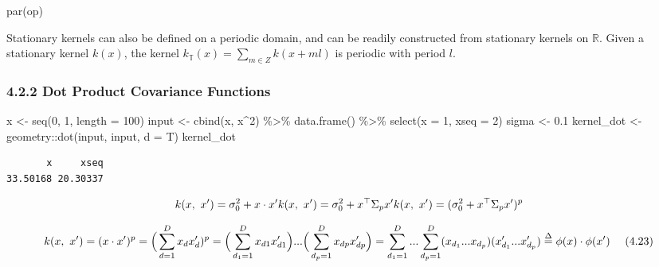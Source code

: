\documentclass[
]{article}
\newenvironment{Shaded}{\begin{snugshade}}{\end{snugshade}}
\newcommand{\AttributeTok}[1]{\textcolor[rgb]{0.77,0.63,0.00}{#1}}
\newcommand{\DecValTok}[1]{\textcolor[rgb]{0.00,0.00,0.81}{#1}}
\newcommand{\FloatTok}[1]{\textcolor[rgb]{0.00,0.00,0.81}{#1}}
\newcommand{\FunctionTok}[1]{\textcolor[rgb]{0.00,0.00,0.00}{#1}}
\newcommand{\NormalTok}[1]{#1}
\newcommand{\OtherTok}[1]{\textcolor[rgb]{0.56,0.35,0.01}{#1}}
\newcommand{\SpecialCharTok}[1]{\textcolor[rgb]{0.00,0.00,0.00}{#1}}
\begin{document}
\begin{Shaded}
\begin{Highlighting}[]
\FunctionTok{par}\NormalTok{(op)}
\end{Highlighting}
\end{Shaded}

Stationary kernels can also be defined on a periodic domain, and can be
readily constructed from stationary kernels on \(\mathbb R\). Given a
stationary kernel \(k(x)\), the kernel
\(k_{\mathbb T}(x) = \sum_{m\in Z} k(x + ml)\) is periodic with period
\(l\).

\hypertarget{dot-product-covariance-functions}{%
\subsubsection{4.2.2 Dot Product Covariance
Functions}\label{dot-product-covariance-functions}}

\begin{Shaded}
\begin{Highlighting}[]
\NormalTok{x }\OtherTok{\textless{}{-}} \FunctionTok{seq}\NormalTok{(}\DecValTok{0}\NormalTok{, }\DecValTok{1}\NormalTok{, }\AttributeTok{length =} \DecValTok{100}\NormalTok{)}
\NormalTok{input }\OtherTok{\textless{}{-}} \FunctionTok{cbind}\NormalTok{(x, x}\SpecialCharTok{\^{}}\DecValTok{2}\NormalTok{) }\SpecialCharTok{\%\textgreater{}\%}
  \FunctionTok{data.frame}\NormalTok{() }\SpecialCharTok{\%\textgreater{}\%}
  \FunctionTok{select}\NormalTok{(}\AttributeTok{x =} \DecValTok{1}\NormalTok{, }\AttributeTok{xseq =} \DecValTok{2}\NormalTok{)}
\NormalTok{sigma }\OtherTok{\textless{}{-}} \FloatTok{0.1}
\NormalTok{kernel\_dot }\OtherTok{\textless{}{-}}\NormalTok{ geometry}\SpecialCharTok{::}\FunctionTok{dot}\NormalTok{(input, input, }\AttributeTok{d =}\NormalTok{ T)}
\NormalTok{kernel\_dot}
\end{Highlighting}
\end{Shaded}

\begin{verbatim}
       x     xseq 
33.50168 20.30337 
\end{verbatim}

\[
k(x,\ x') = \sigma_0^2 + x \cdot x'\\
k(x,\ x') = \sigma_0^2 + x^{\top}\Sigma_px' \\
k(x,\ x') = (\sigma_0^2 + x^{\top}\Sigma_px')^p
\]

\[
k(x,\ x') = (x \cdot x')^p = 
\Big(\sum^D_{d=1}x_dx_d')^p \\
= \Big(\sum^D_{d_1=1}x_{d1}x_{d1}'\Big)... 
\Big(\sum^D_{d_p=1}x_{dp}x_{dp}'\Big)\\
= \sum_{d_1 = 1}^D ... \sum_{d_p = 1}^D
(x_{d_1}...x_{d_p})(x_{d_1}'...x_{d_p}') \\
\stackrel {\Delta}{=} \phi (x) \cdot \phi(x')
\ \ \ \ (4.23)
\]
\end{document}
